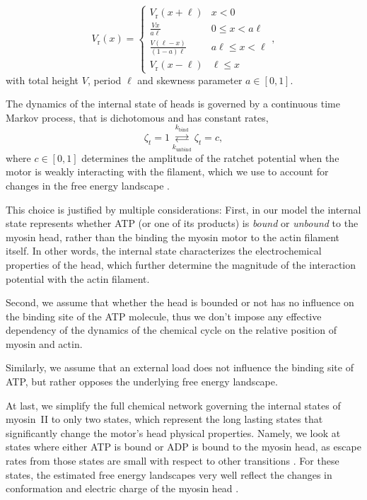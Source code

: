 \documentclass[aps,pre,twocolumn,showpacs,showkeys,superscriptaddress,floatfix]{revtex4-1}
\begin{document}
\begin{equation}
V_\text{r}(x) =  \begin{cases}
        V_\text{r}(x+\ell) & x < 0 \\[1ex] 
        \displaystyle \frac{ V x }{ a \ell } & 0 \leq x < a \ell \\[2ex]
        \displaystyle \frac{ V (\ell-x) }{ (1-a) \ell } & a \ell \leq x < \ell \\[2ex]
        V_\text{r}(x-\ell) & \ell \leq x  
   \end{cases} ,
   \label{eq:ratchet_potential}
\end{equation}
with total height $V$,
period $\ell$ 
and skewness parameter $a \in [0,1]$. 

The dynamics of the internal state of heads is governed by a continuous time Markov process, that is dichotomous and has constant rates,
\begin{equation}
\zeta_t = 1 \overset{k_\text{bind}}{\underset{k_\text{unbind}}{\rightleftarrows}} \zeta_t = c ,
\label{eq:transition}
\end{equation}
where $c\in\left[0,1\right]$ determines the amplitude of the ratchet potential when the motor is weakly interacting with the filament, 
which we use to account for changes in the free energy landscape \cite{Nie2014,nie2014conformational}.

This choice is justified by multiple considerations: 
First, in our model the internal state represents whether ATP (or one of its products) is \emph{bound} or \emph{unbound} to the myosin head,
rather than the binding the myosin motor to the actin filament itself.
In other words, the internal state characterizes the electrochemical properties of the head, 
which further determine the magnitude of the interaction potential with the actin filament.

Second, we assume that whether the head is bounded or not has no influence on the binding site of the ATP molecule,
thus we don't impose any effective dependency of the dynamics of the chemical cycle on the relative position of myosin and actin. 

Similarly, we assume that an external load does not influence the binding site of ATP, 
but rather opposes the underlying free energy landscape. 

At last, we simplify the full chemical network governing the internal states of myosin~II \cite{Bierbaum2011,Bierbaum2013} to only two states,  
which represent the long lasting states that significantly change the motor's head physical properties.
Namely, we look at states where either ATP is bound or ADP  is bound to the myosin head, 
as escape rates from those states are small with respect to other transitions \cite{Bierbaum2011}. 
For these states, the estimated free energy landscapes \cite{Nie2014,nie2014conformational} very well reflect the changes in conformation and electric charge of the myosin head \cite{barterls1993myosin}.
\end{document}
